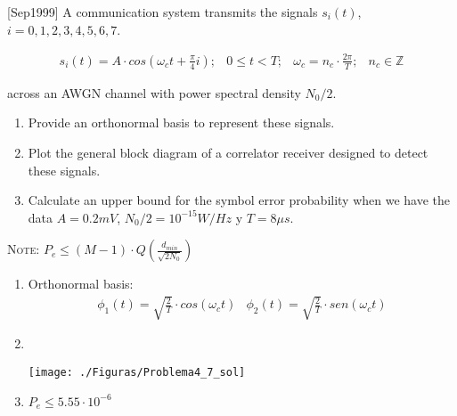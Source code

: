 \documentclass[es,boletin]{uah}
\begin{document}
{
[Sep1999] A communication system transmits the signals $s_i(t)$, $i = 0,1,2,3,4,5,6,7$.

\begin{displaymath}
	\begin{array}{llll}
		s_i(t) = A \cdot cos \left ( \omega_c t + \frac{\pi}{4}i \right ) ; & 0 \leq t < T ; & \omega_c = n_c \cdot \frac{2\pi}{T} ; & n_c \in \mathbb{Z}
	\end{array}
\end{displaymath}

across an AWGN channel with power spectral density $N_0/2$.

\begin{enumerate}
	\item Provide an orthonormal basis to represent these signals.
	\item Plot the general block diagram of a correlator receiver designed to detect these signals.
	\item Calculate an upper bound for the symbol error probability when we have the data $A = 0.2 mV$, $N_0/2 = 10^{-15}  W/Hz$ y $T = 8 \mu s$.
\end{enumerate}

\textsc{Note:} $P_e \leq (M-1) \cdot Q\left (\frac{d_{min}}{\sqrt{2N_0}} \right )$
}
{

\begin{enumerate}
	\item Orthonormal basis:
		\begin{displaymath}
			\begin{array}{ll}
				\phi_1(t) = \sqrt{\frac{2}{T}} \cdot cos(\omega_c t) & \phi_2(t) = \sqrt{\frac{2}{T}} \cdot sen(\omega_c t)
			\end{array}
		\end{displaymath}
	\item \
		\begin{figure*}[h!]
			\centering\texttt{[image: ./Figuras/Problema4\_7\_sol]}
		\end{figure*}
	\item $P_e \leq 5.55 \cdot 10^{-6}$
\end{enumerate}
}

\newpage
\end{document}
